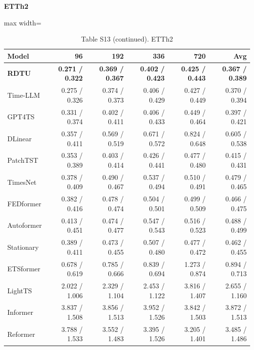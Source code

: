 \begin{table}[H]\centering\small
\caption*{Table S13 (continued). ETTh2}
\textbf{ETTh2}\par\smallskip
\begin{adjustbox}{max width=\linewidth}\begin{tabular}{lrrrrr}\toprule
\textbf{Model} & \textbf{96} & \textbf{192} & \textbf{336} & \textbf{720} & \textbf{Avg}\\\midrule
\rowcolor{blue!5}
\textbf{RDTU} & \textbf{0.271 / 0.322} & \textbf{0.369 / 0.367} & \textbf{0.402 / 0.423} & \textbf{0.425 / 0.443} & \textbf{0.367 / 0.389}\\
Time-LLM & 0.275 / 0.326 & 0.374 / 0.373 & 0.406 / 0.429 & 0.427 / 0.449 & 0.370 / 0.394\\
GPT4TS & 0.331 / 0.374 & 0.402 / 0.411 & 0.406 / 0.433 & 0.449 / 0.464 & 0.397 / 0.421\\
DLinear & 0.357 / 0.411 & 0.569 / 0.519 & 0.671 / 0.572 & 0.824 / 0.648 & 0.605 / 0.538\\
PatchTST & 0.353 / 0.389 & 0.403 / 0.414 & 0.426 / 0.441 & 0.477 / 0.480 & 0.415 / 0.431\\
TimesNet & 0.378 / 0.409 & 0.490 / 0.467 & 0.537 / 0.494 & 0.510 / 0.491 & 0.479 / 0.465\\
FEDformer & 0.382 / 0.416 & 0.478 / 0.474 & 0.504 / 0.501 & 0.499 / 0.509 & 0.466 / 0.475\\
Autoformer & 0.413 / 0.451 & 0.474 / 0.477 & 0.547 / 0.543 & 0.516 / 0.523 & 0.488 / 0.499\\
Stationary & 0.389 / 0.411 & 0.473 / 0.455 & 0.507 / 0.480 & 0.477 / 0.472 & 0.462 / 0.455\\
ETSformer & 0.678 / 0.619 & 0.785 / 0.666 & 0.839 / 0.694 & 1.273 / 0.874 & 0.894 / 0.713\\
LightTS & 2.022 / 1.006 & 2.329 / 1.104 & 2.453 / 1.122 & 3.816 / 1.407 & 2.655 / 1.160\\
Informer & 3.837 / 1.508 & 3.856 / 1.513 & 3.952 / 1.526 & 3.842 / 1.503 & 3.872 / 1.513\\
Reformer & 3.788 / 1.533 & 3.552 / 1.483 & 3.395 / 1.526 & 3.205 / 1.401 & 3.485 / 1.486\\
\bottomrule\end{tabular}\end{adjustbox}\end{table}
